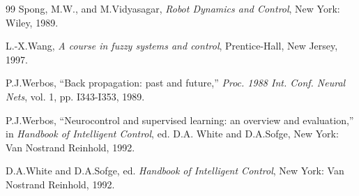 \documentclass[12pt,a4paper]{ctexart}
\begin{document}
\begin{thebibliography}{99}
 Spong, M.W., and M.Vidyasagar, \textit{Robot Dynamics and Control}, New York: Wiley, 1989.

 L.-X.Wang, \textit{A course in fuzzy systems and control}, Prentice-Hall, New Jersey, 1997.

 P.J.Werbos, ``Back propagation: past and future,'' \textit{Proc. 1988 Int. Conf. Neural Nets}, vol. 1, pp. I343-I353, 1989.

 P.J.Werbos, ``Neurocontrol and supervised learning: an overview and evaluation,'' in \textit{Handbook of Intelligent Control}, ed. D.A. White and D.A.Sofge, New York: Van Nostrand Reinhold, 1992.

 D.A.White and D.A.Sofge, ed. \textit{Handbook of Intelligent Control}, New York: Van Nostrand Reinhold, 1992.

\end{thebibliography}
\end{document}
